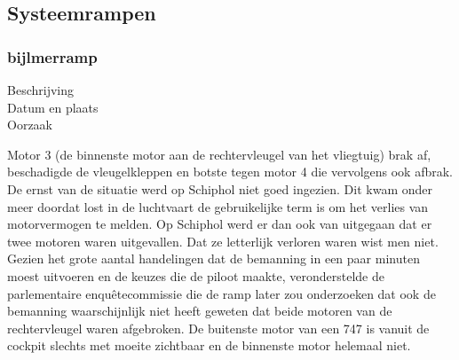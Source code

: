 \subsection{Systeemrampen}
\subsubsection{bijlmerramp}

\begin{description}
	\item[Beschrijving]
	\item[Datum en plaats] 
	\item[Oorzaak]
\end{description}
Motor 3 (de binnenste motor aan de rechtervleugel van het vliegtuig) brak af, beschadigde de vleugelkleppen en botste tegen motor 4 die vervolgens ook afbrak.
De ernst van de situatie werd op Schiphol niet goed ingezien. Dit kwam onder meer doordat lost in de luchtvaart de gebruikelijke term is om het verlies van motorvermogen te melden. Op Schiphol werd er dan ook van uitgegaan dat er twee motoren waren uitgevallen. Dat ze letterlijk verloren waren wist men niet. Gezien het grote aantal handelingen dat de bemanning in een paar minuten moest uitvoeren en de keuzes die de piloot maakte, veronderstelde de parlementaire enquêtecommissie die de ramp later zou onderzoeken dat ook de bemanning waarschijnlijk niet heeft geweten dat beide motoren van de rechtervleugel waren afgebroken. De buitenste motor van een 747 is vanuit de cockpit slechts met moeite zichtbaar en de binnenste motor helemaal niet.

